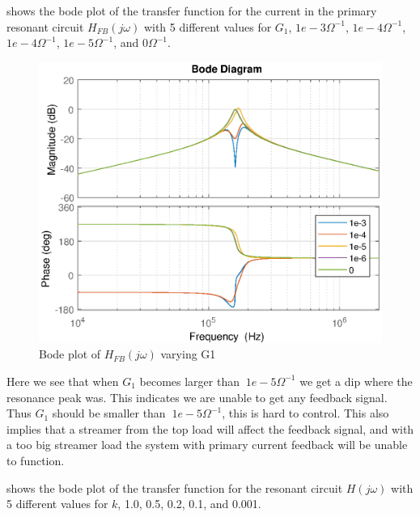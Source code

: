  shows the bode plot of the transfer function for the current in the primary resonant circuit $H_{FB}(j\omega)$ with 5 different values for $G_1$, $1e-3{\Omega}^{-1}$, $1e-4{\Omega}^{-1}$, $1e-4{\Omega}^{-1}$, $1e-5{\Omega}^{-1}$, and $0{\Omega}^{-1}$.
\begin{figure}[H]
    \centering
    \includegraphics[width=\textwidth]{img/FeedBackBode_G1.eps}
    \caption{Bode plot of $H_{FB}(j\omega)$ varying G1}
    \label{fig:fbbode_g1}
\end{figure}

Here we see that when $G_1$ becomes larger than $~1e-5{\Omega}^{-1}$ we get a dip where the resonance peak was. This indicates we are unable to get any feedback signal. Thus $G_1$ should be smaller than $~1e-5{\Omega}^{-1}$, this is hard to control. This also implies that a streamer from the top load will affect the feedback signal, and with a too big streamer load the system with primary current feedback will be unable to function.

\newpage
{} shows the bode plot of the transfer function for the resonant circuit $H(j\omega)$ with 5 different values for $k$, 1.0, 0.5, 0.2, 0.1, and 0.001.

